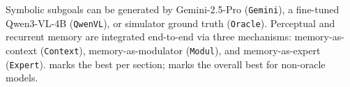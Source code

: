 \begin{table}[t]
{Symbolic subgoals can be generated by Gemini-2.5-Pro (\texttt{Gemini}), a fine-tuned Qwen3-VL-4B (\texttt{QwenVL}), or simulator ground truth (\texttt{Oracle}).
Perceptual and recurrent memory are integrated end-to-end via three mechanisms: memory-as-context (\texttt{Context}), memory-as-modulator (\texttt{Modul}), and memory-as-expert (\texttt{Expert}).
 marks the best per section; \text{\tiny \raisebox{1ex}{\bestbest{}}} marks the overall best for non-oracle models.
}
\label{tab:main}
\vspace{-10pt}
\end{table}

